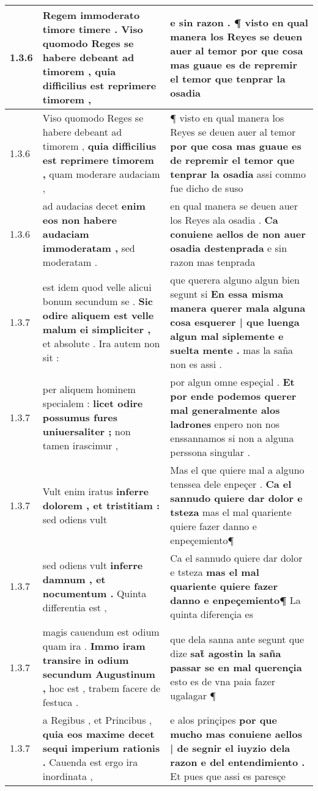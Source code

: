 \begin{tabular}{|p{1cm}|p{6.5cm}|p{6.5cm}|}
1.3.6 & Regem immoderato timore timere . \textbf{ Viso quomodo Reges se habere debeant ad timorem , } quia difficilius est reprimere timorem , & e sin razon . \textbf{ ¶ visto en qual manera los Reyes se deuen auer al temor } por que cosa mas guaue es de repremir el temor que tenprar la osadia \\\hline
1.3.6 & Viso quomodo Reges se habere debeant ad timorem , \textbf{ quia difficilius est reprimere timorem , } quam moderare audaciam , & ¶ visto en qual manera los Reyes se deuen auer al temor \textbf{ por que cosa mas guaue es de repremir el temor que tenprar la osadia } assi commo fue dicho de suso \\\hline
1.3.6 & ad audacias decet \textbf{ enim eos non habere audaciam immoderatam , } sed moderatam . & en qual manera se deuen auer los Reyes ala osadia . \textbf{ Ca conuiene aellos de non auer osadia destenprada } e sin razon mas tenprada \\\hline
1.3.7 & est idem quod velle alicui bonum secundum se . \textbf{ Sic odire aliquem est velle malum ei simpliciter , } et absolute . Ira autem non sit : & que querera alguno algun bien segunt si \textbf{ En essa misma manera querer mala alguna cosa esquerer | que luenga algun mal siplemente e suelta mente . } mas la saña non es assi . \\\hline
1.3.7 & per aliquem hominem specialem : \textbf{ licet odire possumus fures uniuersaliter ; } non tamen irascimur , & por algun omne espeçial . \textbf{ Et por ende podemos querer mal generalmente alos ladrones } enpero non nos enssannamos si non a alguna perssona singular . \\\hline
1.3.7 & Vult enim iratus \textbf{ inferre dolorem , et tristitiam : } sed odiens vult & Mas el que quiere mal a alguno tenssea dele enpeçer . \textbf{ Ca el sannudo quiere dar dolor e tsteza } mas el mal quariente quiere fazer danno e enpeçemiento¶ \\\hline
1.3.7 & sed odiens vult \textbf{ inferre damnum , et nocumentum . } Quinta differentia est , & Ca el sannudo quiere dar dolor e tsteza \textbf{ mas el mal quariente quiere fazer danno e enpeçemiento¶ } La quinta diferençia es \\\hline
1.3.7 & magis cauendum est odium quam ira . \textbf{ Immo iram transire in odium secundum Augustinum , } hoc est , trabem facere de festuca . & que dela sanna ante segunt que dize \textbf{ sat̃ agostin la saña passar se en mal querençia } esto es de vna paia fazer ugalagar ¶ \\\hline
1.3.7 & a Regibus , et Princibus , \textbf{ quia eos maxime decet sequi imperium rationis . } Cauenda est ergo ira inordinata , & e alos prinçipes \textbf{ por que mucho mas conuiene aellos | de segnir el iuyzio dela razon e del entendimiento . } Et pues que assi es paresçe \\\hline

\end{tabular}
